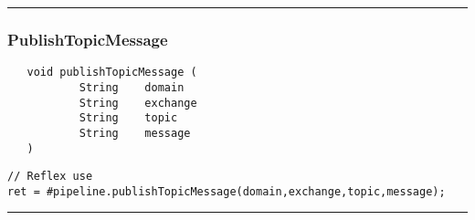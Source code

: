 \rule{15cm}{2pt}
\subsubsection{PublishTopicMessage}
\label{Api:PublishTopicMessage}
\begin{verbatim}
   void publishTopicMessage (
           String    domain
           String    exchange
           String    topic
           String    message
   )
\end{verbatim}
\begin{lstlisting}[language=reflex]
// Reflex use
ret = #pipeline.publishTopicMessage(domain,exchange,topic,message);
\end{lstlisting}



\rule{15cm}{2pt}
